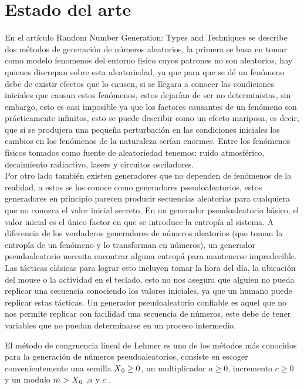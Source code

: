 \documentclass[conference]{IEEEtran}
\begin{document}
\section{Estado del arte}
En el art\'iculo Random Number Generation: Types and Techniques \cite{b1} se describe dos m\'etodos de generaci\'on de n\'umeros aleatorios, la primera se basa en tomar como modelo fenomenos del entorno fisico cuyos patrones no son aleatorios, hay quienes discrepan sobre esta aleatoriedad, ya que para que se d\'e un fen\'omeno debe de existir efectos que lo causen, si se llegara a conocer las condiciones iniciales que causan estos fen\'omenos, estos dejar\'ian de ser no deterministas, sin embargo, esto es casi imposible ya que los factores causantes de un fen\'omeno son pr\'acticamente infinitos, esto se puede describir como un efecto mariposa, es decir, que si se produjera una peque\~na perturbaci\'on en las condiciones iniciales los cambios en los fen\'omenos de la naturaleza ser\'ian enormes. Entre los fen\'omenos f\'isicos tomados como fuente de aleatoriedad tenemos: ruido atmosf\'erico, decaimiento radiactivo, lasers y circuitos osciladores.\\
Por otro lado tambi\'en existen generadores que no dependen de fen\'omenos de la realidad, a estos se los conoce como generadores pseudoaleatorios, estos generadores en principio parecen producir secuencias aleatorias para cualquiera que no conozca el valor inicial secreto. En un generador pseudoaleatorio b\'asico, el valor inicial es el \'unico factor en que se introduce la entrop\'ia al sistema. A diferencia de los verdaderos generadores de n\'umeros aleatorios (que toman la entrop\'ia de un fen\'omeno y lo transforman en n\'umeros), un generador pseudoaleatorio necesita encontrar alguna entrop\'a para mantenerse impredecible. Las t\'acticas cl\'asicas para lograr esto incluyen tomar la hora del d\'ia, la ubicaci\'on del mouse o la actividad en el teclado, esto no nos asegura que alguien no pueda replicar una secuencia conociendo los valores iniciales, ya que un humano puede replicar estas t\'acticas. Un generador pseudoaleatorio confiable es aquel que no nos permite replicar con facilidad una secuencia de n\'umeros, este debe de tener variables que no puedan determinarse en un proceso intermedio.

El m\'etodo de congruencia lineal de Lehmer es uno de los m\'etodos m\'as conocidos para la generaci\'on de n\'umeros pseudoaleatorios, consiste en escoger convenientemente una semilla $X\textsubscript{0}\geq 0$, un multiplicador $a \geq 0$, incremento $c \geq 0$ y un modulo $m >X\textsubscript{0}$ ,$a$ y $c$ .
\end{document}
